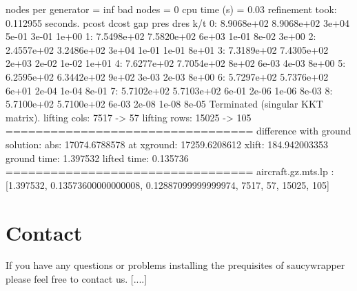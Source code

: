 \begin{DoxyCode}
\textcolor{stringliteral}{nodes per generator = inf}
\textcolor{stringliteral}{bad nodes = 0}
\textcolor{stringliteral}{cpu time (s) = 0.03}
\textcolor{stringliteral}{refinement took:  0.112955 seconds.}
\textcolor{stringliteral}{     pcost       dcost       gap    pres   dres   k/t}
\textcolor{stringliteral}{ 0:  8.9068e+02  8.9068e+02  3e+04  5e-01  3e-01  1e+00}
\textcolor{stringliteral}{ 1:  7.5498e+02  7.5820e+02  6e+03  1e-01  8e-02  3e+00}
\textcolor{stringliteral}{ 2:  2.4557e+02  3.2486e+02  3e+04  1e-01  1e-01  8e+01}
\textcolor{stringliteral}{ 3:  7.3189e+02  7.4305e+02  2e+03  2e-02  1e-02  1e+01}
\textcolor{stringliteral}{ 4:  7.6277e+02  7.7054e+02  8e+02  6e-03  4e-03  8e+00}
\textcolor{stringliteral}{ 5:  6.2595e+02  6.3442e+02  9e+02  3e-03  2e-03  8e+00}
\textcolor{stringliteral}{ 6:  5.7297e+02  5.7376e+02  6e+01  2e-04  1e-04  8e-01}
\textcolor{stringliteral}{ 7:  5.7102e+02  5.7103e+02  6e-01  2e-06  1e-06  8e-03}
\textcolor{stringliteral}{ 8:  5.7100e+02  5.7100e+02  6e-03  2e-08  1e-08  8e-05}
\textcolor{stringliteral}{Terminated (singular KKT matrix).}
\textcolor{stringliteral}{lifting cols:  7517  ->  57}
\textcolor{stringliteral}{lifting rows:  15025  ->  105}
\textcolor{stringliteral}{=================================}
\textcolor{stringliteral}{difference with ground solution: }
\textcolor{stringliteral}{abs:  17074.6788578  at xground:  17259.6208612  xlift:  184.942003353}
\textcolor{stringliteral}{ground time:  1.397532  lifted time:  0.135736}
\textcolor{stringliteral}{=================================}
\textcolor{stringliteral}{aircraft.gz.mts.lp :  [1.397532, 0.13573600000000008, 0.12887099999999974, 7517, 57, 15025, 105]}
\end{DoxyCode}
 \hypertarget{index_contact_sec}{}\section{Contact}\label{index_contact_sec}
If you have any questions or problems installing the prequisites of saucywrapper please feel free to contact us. \mbox{[}....\mbox{]} 